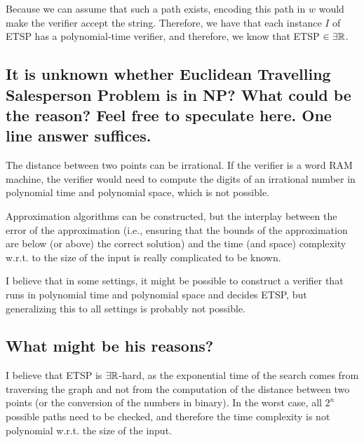 \documentclass{article}
\begin{document}

Because we can assume that such a path exists, encoding this path in $w$ would make the verifier accept the string. Therefore, we have that each instance $I$ of ETSP has a polynomial-time verifier, and therefore, we know that ETSP $\in \exists \mathbb{R}$.

\subsection{\textbf{It is unknown whether Euclidean Travelling Salesperson Problem is in NP? What could be the reason? Feel free to speculate here. One line answer suffices.}}

The distance between two points can be irrational.
If the verifier is a word RAM machine, the verifier would need to compute the digits of an irrational number in polynomial time and polynomial space, which is not possible.

Approximation algorithms can be constructed, but the interplay between the error of the approximation (i.e., ensuring that the bounds of the approximation are below (or above) the correct solution) and the time (and space) complexity w.r.t. to the size of the input is really complicated to be known. 

I believe that in some settings, it might be possible to construct a verifier that runs in polynomial time and polynomial space and decides ETSP, but generalizing this to all settings is probably not possible.

\subsection{\textbf{What might be his reasons?}}

I believe that ETSP is $\exists \mathbb{R}$-hard, as the exponential time of the search comes from traversing the graph and not from the computation of the distance between two points (or the conversion of the numbers in binary).
In the worst case, all $2^n$ possible paths need to be checked, and therefore the time complexity is not polynomial w.r.t. the size of the input.

\end{document}

